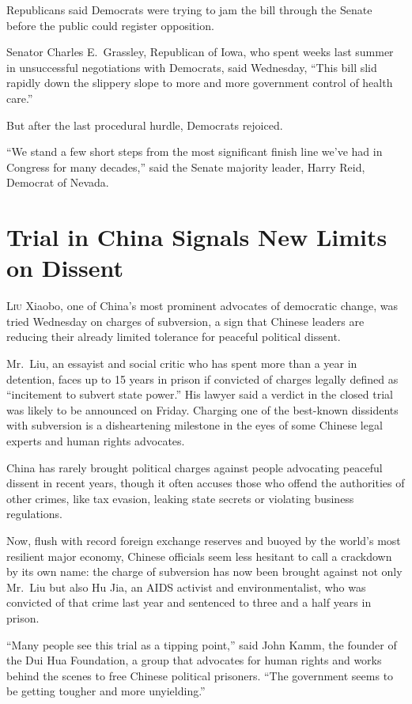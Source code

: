﻿\documentclass[12pt]{article}
\begin{document}
Republicans said Democrats were trying to jam the bill through the Senate before the public could
register opposition.

Senator Charles E.~Grassley, Republican of Iowa, who spent weeks last summer in unsuccessful
negotiations with Democrats, said Wednesday, ``This bill slid rapidly down the slippery slope to
more and more government control of health care.''

But after the last procedural hurdle, Democrats rejoiced.

``We stand a few short steps from the most significant finish line we've had in Congress for many
decades,'' said the Senate majority leader, Harry Reid, Democrat of Nevada.

\section{Trial in China Signals New Limits on Dissent}

\lettrine{L}{iu} Xiaobo, one of China's most prominent advocates of
democratic change, was tried Wednesday on charges of subversion, a sign that Chinese leaders are
reducing their already limited tolerance for peaceful political dissent.

Mr.~Liu, an essayist and social critic who has spent more than a year in detention, faces up to 15
years in prison if convicted of charges legally defined as ``incitement to subvert state power.''
His lawyer said a verdict in the closed trial was likely to be announced on Friday. Charging one of
the best-known dissidents with subversion is a disheartening milestone in the eyes of some Chinese
legal experts and human rights advocates.

China has rarely brought political charges against people advocating peaceful dissent in recent
years, though it often accuses those who offend the authorities of other crimes, like tax evasion,
leaking state secrets or violating business regulations.

Now, flush with record foreign exchange reserves and buoyed by the world's most resilient major
economy, Chinese officials seem less hesitant to call a crackdown by its own name: the charge of
subversion has now been brought against not only Mr.~Liu but also Hu Jia, an AIDS activist and
environmentalist, who was convicted of that crime last year and sentenced to three and a half years
in prison.

``Many people see this trial as a tipping point,'' said John Kamm, the founder of the Dui Hua
Foundation, a group that advocates for human rights and works behind the scenes to free Chinese
political prisoners. ``The government seems to be getting tougher and more unyielding.''
\end{document}
